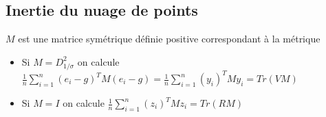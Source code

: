 \documentclass[letterpaper,10pt,french]{sphinxmanual}
\begin{document}
\subsection{Inertie du nuage de points}
\label{\detokenize{acp:inertie-du-nuage-de-points}}
\sphinxAtStartPar
\(M\) est une matrice symétrique définie positive correspondant à la métrique
\begin{itemize}
\item {} 
\sphinxAtStartPar
Si \(M=D^2_{1/\sigma}\) on calcule \( \frac{1}{n}\displaystyle\sum_{i=1}^n (e_i - g)^T M (e_i-g) = \frac{1}{n}\displaystyle\sum_{i=1}^n (y_i)^T M y_i = Tr(VM)\)

\item {} 
\sphinxAtStartPar
Si \(M=I\) on calcule \( \frac{1}{n}\displaystyle\sum_{i=1}^n (z_i)^T M z_i = Tr(RM)\)

\end{itemize}
\end{document}
